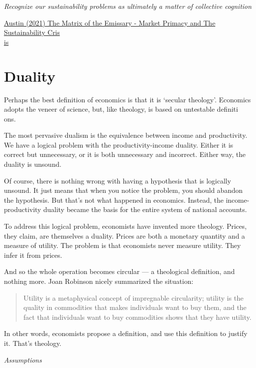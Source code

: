 \documentclass[
]{book}
\begin{document}
\emph{Recognize our sustainability problems as ultimately a matter of collective cognition}

\href{https://channelmcgilchrist.com/articles/the-matrix-of-the-emissary/}{Austin (2021) The Matrix of the Emissary - Market Primacy and The Sustainability Cris\\
is}

\hypertarget{duality}{%
\chapter{Duality}\label{duality}}

Perhaps the best definition of economics is that it is `secular theology'.
Economics adopts the veneer of science, but, like theology, is based on untestable definiti\\
ons.

The most pervasive dualism is the equivalence between income and productivity.
We have a logical problem with the productivity-income duality. Either it is correct but unnecessary, or it is both unnecessary and incorrect. Either way, the duality is unsound.

Of course, there is nothing wrong with having a hypothesis that is logically unsound. It just means that when you notice the problem, you should abandon the hypothesis. But that's not what happened in economics. Instead, the income-productivity duality became the basis for the entire system of national accounts.

To address this logical problem, economists have invented more theology. Prices, they claim, are themselves a duality. Prices are both a monetary quantity and a measure of utility.
The problem is that economists never measure utility. They infer it from prices.

And so the whole operation becomes circular --- a theological definition, and nothing more. Joan Robinson nicely summarized the situation:

\begin{quote}
Utility is a metaphysical concept of impregnable circularity; utility is the quality in commodities that makes individuals want to buy them, and the fact that individuals want to buy commodities shows that they have utility.
\end{quote}

In other words, economists propose a definition, and use this definition to justify it.
That's theology.

\emph{Assumptions}
\end{document}
